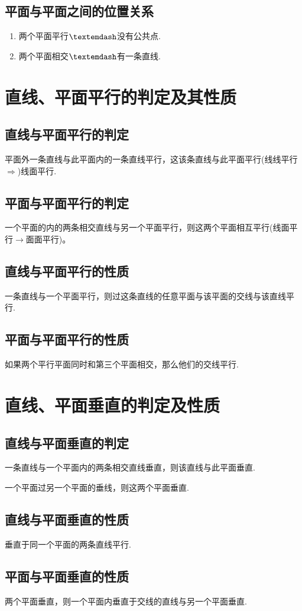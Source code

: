 \subsection{平面与平面之间的位置关系}
\begin{enumerate}
	\item 两个平面平行$\textemdash $没有公共点.
	\item 两个平面相交$\textemdash $有一条直线.
\end{enumerate}
\section{直线、平面平行的判定及其性质}
\subsection{直线与平面平行的判定}
\begin{theorem}{}{}
	平面外一条直线与此平面内的一条直线平行，这该条直线与此平面平行(线线平行$\Rightarrow$)线面平行.
\end{theorem}
\subsection{平面与平面平行的判定}
\begin{theorem}{}{}
	一个平面的内的两条相交直线与另一个平面平行，则这两个平面相互平行(线面平行$\rightarrow$面面平行)。
\end{theorem}
\subsection{直线与平面平行的性质}
\begin{theorem}{}{}
	一条直线与一个平面平行，则过这条直线的任意平面与该平面的交线与该直线平行.
\end{theorem}
\subsection{平面与平面平行的性质}
\begin{theorem}{}{}
	如果两个平行平面同时和第三个平面相交，那么他们的交线平行.
\end{theorem}
\section{直线、平面垂直的判定及性质}
\subsection{直线与平面垂直的判定}
\begin{theorem}{}{}
	一条直线与一个平面内的两条相交直线垂直，则该直线与此平面垂直.
\end{theorem}
\begin{theorem}{}{}
	一个平面过另一个平面的垂线，则这两个平面垂直.
\end{theorem}
\subsection{直线与平面垂直的性质}
\begin{theorem}{}{}
	垂直于同一个平面的两条直线平行.
\end{theorem}
\subsection{平面与平面垂直的性质}
\begin{theorem}{}{}
	两个平面垂直，则一个平面内垂直于交线的直线与另一个平面垂直.
\end{theorem}